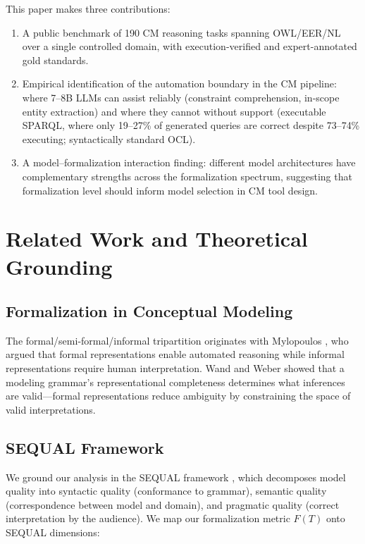 \documentclass[runningheads]{llncs}
\begin{document}
This paper makes three contributions:
\begin{enumerate}[noitemsep]
  \item A public benchmark of 190 CM reasoning tasks spanning OWL/EER/NL over a single controlled domain, with execution-verified and expert-annotated gold standards.
  \item Empirical identification of the automation boundary in the CM pipeline: where 7--8B LLMs can assist reliably (constraint comprehension, in-scope entity extraction) and where they cannot without support (executable SPARQL, where only 19--27\% of generated queries are correct despite 73--74\% executing; syntactically standard OCL).
  \item A model--formalization interaction finding: different model architectures have complementary strengths across the formalization spectrum, suggesting that formalization level should inform model selection in CM tool design.
\end{enumerate}

\section{Related Work and Theoretical Grounding}
\label{sec:related}

\subsection{Formalization in Conceptual Modeling}

The formal/semi-formal/informal tripartition originates with Mylopoulos \cite{mylopoulos1992conceptual}, who argued that formal representations enable automated reasoning while informal representations require human interpretation. Wand and Weber \cite{wand1990ontological} showed that a modeling grammar's representational completeness determines what inferences are valid---formal representations reduce ambiguity by constraining the space of valid interpretations.

\subsection{SEQUAL Framework}

We ground our analysis in the SEQUAL framework \cite{krogstie1995quality,krogstie2016quality}, which decomposes model quality into syntactic quality (conformance to grammar), semantic quality (correspondence between model and domain), and pragmatic quality (correct interpretation by the audience). We map our formalization metric $F(T)$ onto SEQUAL dimensions:
\end{document}
